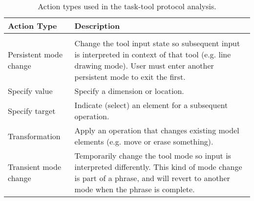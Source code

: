 
\begin{table}%
\centering
\begin{tabular}{l | p{11cm}}
\textbf{Action Type} & \textbf{Description} \\
\hline
&\\

Persistent mode change & 

Change the tool input state so subsequent input is interpreted in
context of that tool (e.g. line drawing mode). User must enter another
persistent mode to exit the first.

\\

Specify value &

Specify a dimension or location.

\\

Specify target &

Indicate (select) an element for a subsequent operation.

\\

Transformation &

Apply an operation that changes existing model elements (e.g. move or
erase something).

\\

Transient mode change &

Temporarily change the tool mode so input is interpreted
differently. This kind of mode change is part of a phrase, and will
revert to another mode when the phrase is complete.

\\
\hline
\end{tabular}
\caption{Action types used in the task-tool protocol analysis.}
\label{tab:task-tool-protocol}
\end{table}
